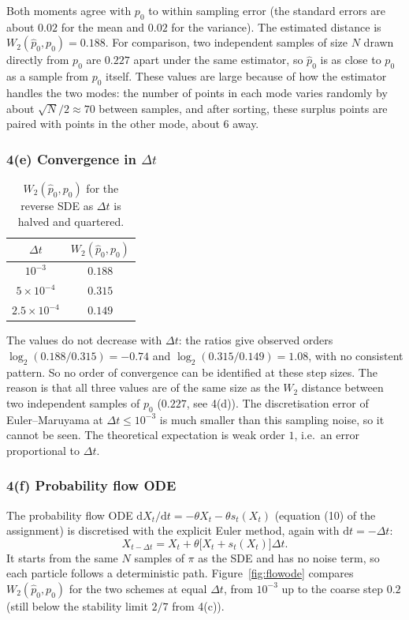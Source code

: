 \documentclass[11pt]{article}
\newcommand{\dd}{\mathrm{d}}
\begin{document}
Both moments agree with $p_0$ to within sampling error (the standard errors are about $0.02$ for the mean and $0.02$ for
the variance). The estimated distance is $W_2(\hat p_0,p_0) = 0.188$. For comparison, two independent samples of size $N$
drawn directly from $p_0$ are $0.227$ apart under the same estimator, so $\hat p_0$ is as close to $p_0$ as a sample
from $p_0$ itself. These values are large because of how the estimator handles the two modes: the number of points
in each mode varies randomly by about $\sqrt N/2\approx70$ between samples, and after sorting, these surplus points
are paired with points in the other mode, about $6$ away.

\subsubsection*{4(e) Convergence in $\Delta t$}

\begin{table}[H]
\centering
\begin{tabular}{cc}
\hline
$\Delta t$ & $W_2(\hat p_0,p_0)$ \\
\hline
$10^{-3}$ & $0.188$ \\
$5\times10^{-4}$ & $0.315$ \\
$2.5\times10^{-4}$ & $0.149$ \\
\hline
\end{tabular}
\caption{$W_2(\hat p_0,p_0)$ for the reverse SDE as $\Delta t$ is halved and quartered.}
\label{tab:stepsize}
\end{table}

The values do not decrease with $\Delta t$: the ratios give observed orders $\log_2(0.188/0.315) = -0.74$ and
$\log_2(0.315/0.149) = 1.08$, with no consistent pattern. So no order of convergence can be identified at these step sizes.
The reason is that all three values are of the same size as the $W_2$ distance between two independent samples of
$p_0$ ($0.227$, see 4(d)). The discretisation error of Euler--Maruyama at $\Delta t\le10^{-3}$ is much smaller than this sampling
noise, so it cannot be seen. The theoretical expectation is weak order $1$, i.e.\ an error proportional to $\Delta t$.

\subsubsection*{4(f) Probability flow ODE}

The probability flow ODE $\dd X_t/\dd t = -\theta X_t - \theta s_t(X_t)$ (equation (10) of the assignment) is discretised with the explicit Euler method, again with $\dd t=-\Delta t$:
\[
X_{t-\Delta t} = X_t + \theta\bigl[X_t + s_t(X_t)\bigr]\Delta t .
\]
It starts from the same $N$ samples of $\pi$ as the SDE and has no noise term, so each particle follows a deterministic
path. Figure~\ref{fig:flowode} compares $W_2(\hat p_0,p_0)$ for the two schemes at equal $\Delta t$, from $10^{-3}$ up to the coarse
step $0.2$ (still below the stability limit $2/7$ from 4(c)).
\end{document}
